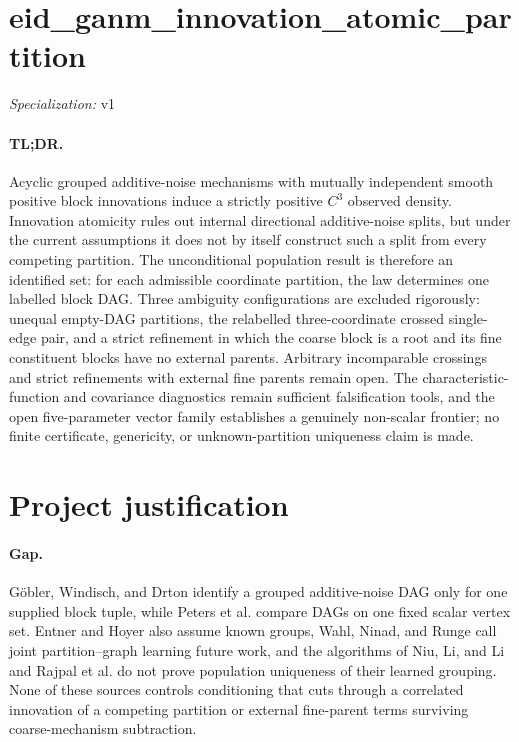 \documentclass{article}
\begin{document}
\sloppy

\section*{eid\_\allowbreak{}ganm\_\allowbreak{}innovation\_\allowbreak{}atomic\_\allowbreak{}partition}

\noindent\textit{Specialization:} v1\par

\paragraph{TL;DR.} Acyclic grouped additive-noise mechanisms with mutually independent smooth positive block innovations induce a strictly positive \(C^3\) observed density. Innovation atomicity rules out internal directional additive-noise splits, but under the current assumptions it does not by itself construct such a split from every competing partition. The unconditional population result is therefore an identified set: for each admissible coordinate partition, the law determines one labelled block DAG. Three ambiguity configurations are excluded rigorously: unequal empty-DAG partitions, the relabelled three-coordinate crossed single-edge pair, and a strict refinement in which the coarse block is a root and its fine constituent blocks have no external parents. Arbitrary incomparable crossings and strict refinements with external fine parents remain open. The characteristic-function and covariance diagnostics remain sufficient falsification tools, and the open five-parameter vector family establishes a genuinely non-scalar frontier; no finite certificate, genericity, or unknown-partition uniqueness claim is made.

\section{Project justification}

\paragraph{Gap.} Göbler, Windisch, and Drton identify a grouped additive-noise DAG only for one supplied block tuple, while Peters et al. compare DAGs on one fixed scalar vertex set. Entner and Hoyer also assume known groups, Wahl, Ninad, and Runge call joint partition--graph learning future work, and the algorithms of Niu, Li, and Li and Rajpal et al. do not prove population uniqueness of their learned grouping. None of these sources controls conditioning that cuts through a correlated innovation of a competing partition or external fine-parent terms surviving coarse-mechanism subtraction.
\end{document}
